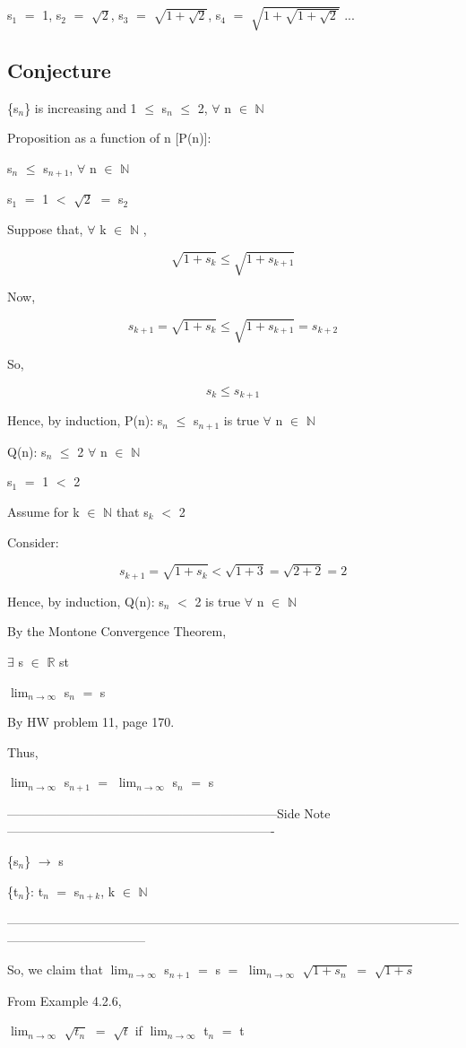\documentclass{article}
\newcommand{\mt}[1]{\ensuremath{#1}}
\newcommand\ssc[2][\DefaultOpt]{%
  \def\DefaultOpt{#2}%
  \subsection[#1]{#2}%
}
\newcommand{\sidenote}[1]{-----------------------------------------------------------------Side Note----------------------------------------------------------------
#1 \

---------------------------------------------------------------------------------------------------------------------------------------------}
\newcommand{\br}{\mt{\mathbb{R}} }       %
\newcommand{\bn}{\mt{\mathbb{N}} }       %
\newcommand{\fa}{\mt{\forall} }          %
\newcommand{\mem}{\mt{\in} }
\newcommand{\exs}{\mt{\exists} }
\newcommand{\lra}{ \mt{\longrightarrow} } %
\newcommand{\bk}[1]{\{#1\}}
\newcommand{\ps}{\mt{+} }
\newcommand{\ls}{\mt{<} }
\newcommand{\lse}{\mt{\leq} }
\newcommand{\eql}{\mt{=} }
\newcommand{\uw}[2]{#1\mt{_{#2}}}
\newcommand{\lmti}[1]{\mt{\displaystyle{\lim_{#1 \to \infty}}}}
\newcommand{\eqn}[1]{\[#1\]}
\begin{document}
{{\uw{s}{1} \eql 1, \uw{s}{2} \eql $\sqrt{2}$, \uw{s}{3} \eql $\sqrt{1 \ps \sqrt{2}}$, \uw{s}{4} \eql $\sqrt{1 + \sqrt{1 \ps \sqrt{2}}}$ ...

}

\ssc{Conjecture}{

\bk{\uw{s}{n}} is increasing and 1 \lse \uw{s}{n} \lse 2, \fa n \mem \bn

Proposition as a function of n [P(n)]:

\uw{s}{n} \lse \uw{s}{n + 1}, \fa n \mem \bn 

\uw{s}{1} \eql 1 \ls $\sqrt{2}$ \eql \uw{s}{2}

Suppose that, \fa k \mem \bn,

\eqn{\sqrt{1 + s_k} \lse \sqrt{1 + s_{k + 1}}}

Now,

\eqn{s_{k + 1} = \sqrt{1	 + s_k} \lse \sqrt{1 + s_{k + 1}} = s_{k + 2}}

So,

\eqn{s_k \lse s_{k + 1}}

Hence, by induction, P(n): \uw{s}{n} \lse \uw{s}{n + 1} is true \fa n \mem \bn 

Q(n): \uw{s}{n} \lse 2 \fa n \mem \bn 

\uw{s}{1} \eql 1 \ls 2

Assume for k \mem \bn that \uw{s}{k} \ls 2

Consider:

\eqn{s_{k + 1} = \sqrt{1 + s_k} < \sqrt{1 + 3} = \sqrt{2 + 2} = 2}

Hence, by induction, Q(n): \uw{s}{n} \ls 2 is true \fa n \mem \bn 

}

By the Montone Convergence Theorem,

\exs s \mem \br st

\lmti{n} \uw{s}{n} \eql s

By HW problem 11, page 170.

Thus,

\lmti{n} \uw{s}{n + 1} \eql \lmti{n} \uw{s}{n} \eql s

\newpage

\sidenote{
\bk{\uw{s}{n}} \lra s

\bk{\uw{t}{n}}: \uw{t}{n} \eql \uw{s}{n + k}, k \mem \bn 
}

So, we claim that \lmti{n} \uw{s}{n + 1} \eql s \eql \lmti{n} $\sqrt{1 + s_n}$ \eql $\sqrt{1 + s}$

From Example 4.2.6,

\lmti{n} $\sqrt{\uw{t}{n}}$ \eql $\sqrt{t}$ if \lmti{n} \uw{t}{n} \eql t

}
\end{document}
